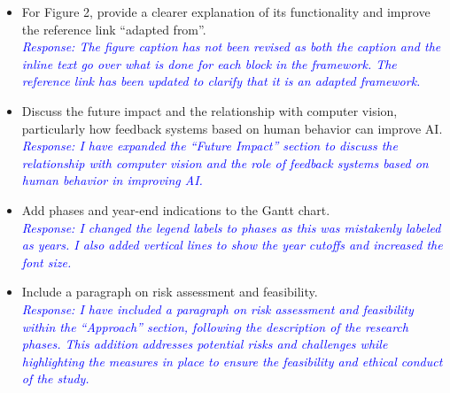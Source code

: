 \documentclass[10pt]{article}
\begin{document}
\begin{itemize}
  \item For Figure 2, provide a clearer explanation of its functionality and improve the reference link “adapted from”.\\
        \textcolor{blue}{\textit{Response: The figure caption has not been
            revised as both the caption and the inline text go over what is done for
            each block in the framework. The reference link has been updated to
            clarify that it is an adapted framework.}}

  \item Discuss the future impact and the relationship with computer vision, particularly how feedback systems based on human behavior can improve AI.\\
        \textcolor{blue}{\textit{Response: I have expanded the ``Future Impact'' section to discuss the relationship with computer vision and the role of feedback systems based on human behavior in improving AI.}}

  \item Add phases and year-end indications to the Gantt chart.\\
        \textcolor{blue}{\textit{Response: I changed the legend labels to phases
            as this was mistakenly labeled as years. I also added vertical lines
            to show the year cutoffs and increased the font size.}}

  \item Include a paragraph on risk assessment and feasibility.\\
        \textcolor{blue}{\textit{Response: I have included a paragraph on risk assessment and feasibility within the ``Approach'' section, following the description of the research phases. This addition addresses potential risks and challenges while highlighting the measures in place to ensure the feasibility and ethical conduct of the study.}}
\end{itemize}
\end{document}
